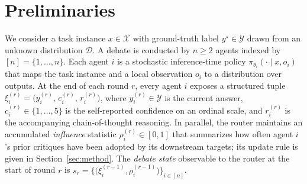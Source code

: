 \section{Preliminaries}
\label{sec:preliminaries}

We consider a task instance $x\in\mathcal{X}$ with ground-truth label $y^\star\in\mathcal{Y}$ drawn from an unknown distribution $\mathcal{D}$. A debate is conducted by $n\geq 2$ agents indexed by $[n]=\{1,\ldots,n\}$. Each agent $i$ is a stochastic inference-time policy $\pi_{\theta_i}(\cdot\mid x,o_i)$ that maps the task instance and a local observation $o_i$ to a distribution over outputs.
At the end of each round $r$, every agent $i$ exposes a structured tuple
    \(\xi_i^{(r)}=\big(y_i^{(r)},\,c_i^{(r)},\,r_i^{(r)}\big)\),
where $y_i^{(r)}\in\mathcal{Y}$ is the current answer, $c_i^{(r)}\in\{1,\ldots,5\}$ is the self-reported confidence on an ordinal scale, and $r_i^{(r)}$ is the accompanying chain-of-thought reasoning. In parallel, the router maintains an accumulated \emph{influence} statistic $\rho_i^{(r)}\in[0,1]$ that summarizes how often agent $i$'s prior critiques have been adopted by its downstream targets; its update rule is given in Section~\ref{sec:method}. The \emph{debate state} observable to the router at the start of round $r$ is
    \(s_r=\big\{\big(\xi_i^{(r-1)},\rho_i^{(r-1)}\big)\big\}_{i\in[n]}\).

